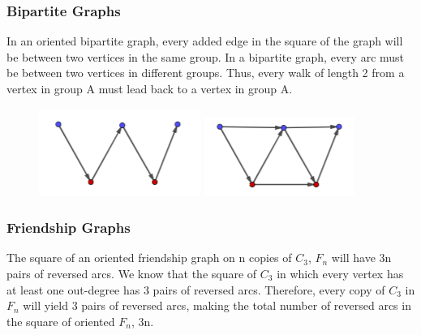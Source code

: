 \documentclass{article}
\begin{document}
\subsubsection{Bipartite Graphs}
In an oriented bipartite graph, every added edge in the square of the graph will be between two vertices in the same group. In a bipartite graph, every arc must be between two vertices in different groups. Thus, every walk of length 2 from a vertex in group A must lead back to a vertex in group A. 
\begin{figure}[ht]
    \includegraphics{bipartite.PNG}
    \includegraphics{bipartitesq.PNG}
\end{figure}
\subsubsection{Friendship Graphs}
The square of an oriented friendship graph on n copies of $C_3$, $F_n$ will have 3n pairs of reversed arcs. We know that the square of $C_3$ in which every vertex has at least one out-degree has 3 pairs of reversed arcs. Therefore, every copy of $C_3$ in $F_n$ will yield 3 pairs of reversed arcs, making the total number of reversed arcs in the square of oriented $F_n$, 3n.
\end{document}
